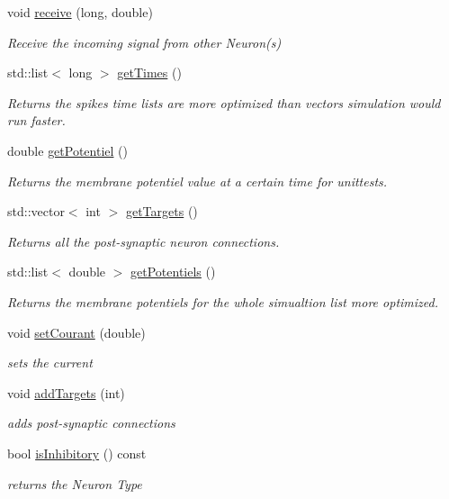 \begin{DoxyCompactItemize}
void \hyperlink{classneurone_af1e157df98fa2c15cb70bc50032d39c0}{receive} (long, double)
\begin{DoxyCompactList}\small\item\em Receive the incoming signal from other Neuron(s) \end{DoxyCompactList}\item 
std\+::list$<$ long $>$ \hyperlink{classneurone_a36c9b4a43331890178cf8ef774cf53f7}{get\+Times} ()
\begin{DoxyCompactList}\small\item\em Returns the spikes time lists are more optimized than vectors simulation would run faster. \end{DoxyCompactList}\item 
double \hyperlink{classneurone_a938d3de8c8ae1c340e72e4a95c54299b}{get\+Potentiel} ()
\begin{DoxyCompactList}\small\item\em Returns the membrane potentiel value at a certain time for unittests. \end{DoxyCompactList}\item 
std\+::vector$<$ int $>$ \hyperlink{classneurone_a9570ddccdc114d63de75d2c454fbcb52}{get\+Targets} ()
\begin{DoxyCompactList}\small\item\em Returns all the post-\/synaptic neuron connections. \end{DoxyCompactList}\item 
std\+::list$<$ double $>$ \hyperlink{classneurone_a2dc85a6664fb7c1ada0283c23460fe1f}{get\+Potentiels} ()
\begin{DoxyCompactList}\small\item\em Returns the membrane potentiels for the whole simualtion list more optimized. \end{DoxyCompactList}\item 
void \hyperlink{classneurone_aee16c91befdb31b71067f7e800053d46}{set\+Courant} (double)
\begin{DoxyCompactList}\small\item\em sets the current \end{DoxyCompactList}\item 
void \hyperlink{classneurone_a8c25852b6c75970227a57b51665dd5b8}{add\+Targets} (int)
\begin{DoxyCompactList}\small\item\em add\textquotesingle{}s post-\/synaptic connections \end{DoxyCompactList}\item 
bool \hyperlink{classneurone_ae3f754b75dc3f92cd9964785d4f6b935}{is\+Inhibitory} () const
\begin{DoxyCompactList}\small\item\em returns the Neuron Type \end{DoxyCompactList}\end{DoxyCompactItemize}


